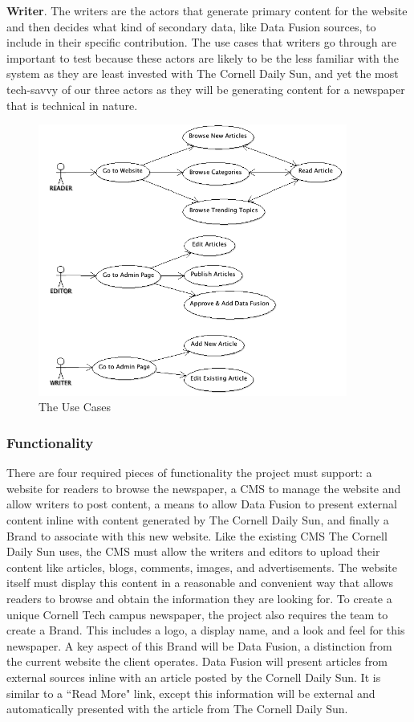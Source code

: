 \documentclass[11pt]{article} %
\begin{document}
\textbf{Writer}. The writers are the actors that generate primary content for the website and then decides what kind of secondary data, like Data Fusion sources, to include in their specific contribution. The use cases that writers go through are important to test because these actors are likely to be the less familiar with the system as they are least invested with The Cornell Daily Sun, and yet the most tech-savvy of our three actors as they will be generating content for a newspaper that is technical in nature.


\begin{figure}[h]
\begin{center}
\includegraphics[width=4in]{images/use_case}
\end{center}
\caption{The Use Cases}
\end{figure}
                   
\subsubsection{Functionality}
                   
There are four required pieces of functionality the project must support: a website for readers to browse the newspaper, a CMS to manage the website and allow writers to post content, a means to allow Data Fusion to present external content inline with content generated by The Cornell Daily Sun, and finally a Brand to associate with this new website. Like the existing CMS The Cornell Daily Sun uses, the CMS must allow the writers and editors to upload their content like articles, blogs, comments, images, and advertisements. The website itself must display this content in a reasonable and convenient way that allows readers to browse and obtain the information they are looking for. To create a unique Cornell Tech campus newspaper, the project also requires the team to create a Brand. This includes a logo, a display name, and a look and feel for this newspaper. A key aspect of this Brand will be Data Fusion, a distinction from the current website the client operates. Data Fusion will present articles from external sources inline with an article posted by the Cornell Daily Sun. It is similar to a ``Read More" link, except this information will be external and automatically presented with the article from The Cornell Daily Sun.
                   
\end{document}
